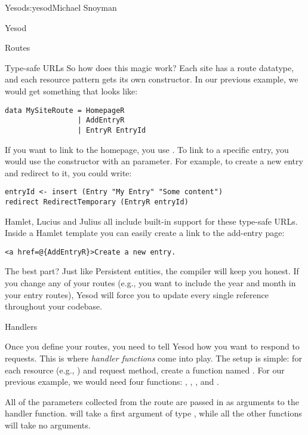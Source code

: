 \begin{aosachapter}{Yesod}{s:yesod}{Michael Snoyman}
\begin{aosasect1}{Yesod}
\begin{aosasect2}{Routes}
\begin{aosasect3}{Type-safe URLs}
So how does this magic work? Each site has a route datatype, and each
resource pattern gets its own constructor. In our previous example, we
would get something that looks like:

\begin{verbatim}
data MySiteRoute = HomepageR
                 | AddEntryR
                 | EntryR EntryId

\end{verbatim}

If you want to link to the homepage, you use . To link
to a specific entry, you would use the  constructor with
an  parameter. For example, to create a new entry and
redirect to it, you could write:

\begin{verbatim}
entryId <- insert (Entry "My Entry" "Some content")
redirect RedirectTemporary (EntryR entryId)
\end{verbatim}

Hamlet, Lucius and Julius all include built-in support for these
type-safe URLs. Inside a Hamlet template you can easily create a link
to the add-entry page:

\begin{verbatim}
<a href=@{AddEntryR}>Create a new entry.
\end{verbatim}

The best part? Just like Persistent entities, the compiler will keep
you honest. If you change any of your routes (e.g., you want to
include the year and month in your entry routes), Yesod will force you
to update every single reference throughout your codebase.

\end{aosasect3}

\end{aosasect2}

\begin{aosasect2}{Handlers}

Once you define your routes, you need to tell Yesod how you want to
respond to requests. This is where \emph{handler functions} come into
play. The setup is simple: for each resource (e.g., )
and request method, create a function named . For our
previous example, we would need four functions: ,
, , and .

All of the parameters collected from the route are passed in as
arguments to the handler function.  will take a first
argument of type , while all the other functions will take no
arguments.


\end{aosasect2}
\end{aosasect1}
\end{aosachapter}

